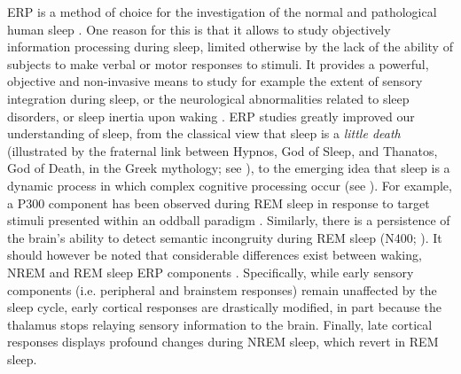 ERP is a method of choice for the investigation of the normal and pathological human sleep \citep{bastuji_evoked_1999, colrain_use_2007}. One reason for this is that it allows to study objectively information processing during sleep, limited otherwise by the lack of the ability of subjects to make verbal or motor responses to stimuli. It provides a powerful, objective and non-invasive means to study for example the extent of sensory integration during sleep, or the neurological abnormalities related to sleep disorders, or sleep inertia upon waking \citep{bastuji_event-related_2003}.
ERP studies greatly improved our understanding of sleep, from the classical view that sleep is a \emph{little death} (illustrated by the fraternal link between Hypnos, God of Sleep, and Thanatos, God of Death, in the Greek mythology; see \citealp{mazza_asleep_2014}), to the emerging idea that sleep is a dynamic process in which complex cognitive processing occur (see \citealp{andrillon_sleeping_2016}). For example, a P300 component has been observed during REM sleep in response to target stimuli presented within an oddball paradigm \citep{bastuji_brain_1995}. Similarly, there is a persistence of the brain’s ability to detect semantic incongruity during REM sleep  (N400; \citealp{perrin_detection_2002}).
It should however be noted that considerable differences exist between waking, NREM and REM sleep ERP components \citep{bastuji_evoked_1999, colrain_use_2007}. Specifically, while early sensory components (i.e. peripheral and brainstem responses) remain unaffected by the sleep cycle, early cortical responses are drastically modified, in part because the thalamus stops relaying sensory information to the brain. Finally, late cortical responses displays profound changes during NREM sleep, which revert in REM sleep.
